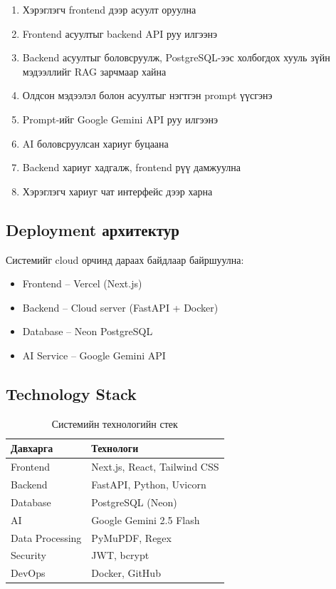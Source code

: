 \begin{enumerate}
    \item Хэрэглэгч frontend дээр асуулт оруулна
    \item Frontend асуултыг backend API руу илгээнэ
    \item Backend асуултыг боловсруулж, PostgreSQL-ээс холбогдох хууль зүйн мэдээллийг RAG зарчмаар хайна
    \item Олдсон мэдээлэл болон асуултыг нэгтгэн prompt үүсгэнэ
    \item Prompt-ийг Google Gemini API руу илгээнэ
    \item AI боловсруулсан хариуг буцаана
    \item Backend хариуг хадгалж, frontend рүү дамжуулна
    \item Хэрэглэгч хариуг чат интерфейс дээр харна
\end{enumerate}


\subsection{Deployment архитектур}

Системийг cloud орчинд дараах байдлаар байршуулна:

\begin{itemize}
    \item Frontend -- Vercel (Next.js)
    \item Backend -- Cloud server (FastAPI + Docker)
    \item Database -- Neon PostgreSQL
    \item AI Service -- Google Gemini API
\end{itemize}


\subsection{Technology Stack}

\begin{table}[H]
\centering
\renewcommand{\arraystretch}{1.3}
\begin{tabular}{|p{4cm}|p{8cm}|}
\hline
\textbf{Давхарга} & \textbf{Технологи} \\ \hline
Frontend & Next.js, React, Tailwind CSS \\ \hline
Backend & FastAPI, Python, Uvicorn \\ \hline
Database & PostgreSQL (Neon) \\ \hline
AI & Google Gemini 2.5 Flash \\ \hline
Data Processing & PyMuPDF, Regex \\ \hline
Security & JWT, bcrypt \\ \hline
DevOps & Docker, GitHub \\ \hline
\end{tabular}
\caption{Системийн технологийн стек}
\end{table}

